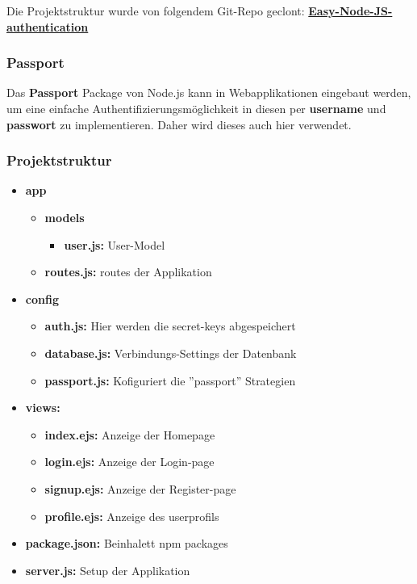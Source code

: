 Die Projektstruktur wurde von folgendem Git-Repo geclont:
\textbf{\hyperlink{https://github.com/scotch-io/easy-node-authentication/tree/local}{Easy-Node-JS-authentication}}

\subsubsection{Passport}
Das \textbf{Passport} Package von Node.js kann in Webapplikationen eingebaut werden, um eine einfache Authentifizierungsmöglichkeit in diesen per \textbf{username} und \textbf{passwort} zu implementieren. Daher wird dieses auch hier verwendet.

\subsubsection{Projektstruktur}

\begin{itemize}
	\item \textbf{app}
	\begin{itemize}
		\item \textbf{models}
		\begin{itemize}
			\item \textbf{user.js:} User-Model
		\end{itemize}
		\item \textbf{routes.js:} routes der Applikation
	\end{itemize}
	\item \textbf{config}
	\begin{itemize}
		\item \textbf{auth.js:} Hier werden die secret-keys abgespeichert
		\item \textbf{database.js:} Verbindungs-Settings der Datenbank
		\item \textbf{passport.js:} Kofiguriert die ''passport'' Strategien
	\end{itemize}
	\item \textbf{views:}
	\begin{itemize}
		\item \textbf{index.ejs:} Anzeige der Homepage
		\item \textbf{login.ejs:} Anzeige der Login-page
		\item \textbf{signup.ejs:} Anzeige der Register-page
		\item \textbf{profile.ejs:} Anzeige des userprofils
	\end{itemize}
	\item \textbf{package.json:} Beinhalett npm packages
	\item \textbf{server.js:} Setup der Applikation
\end{itemize} 

